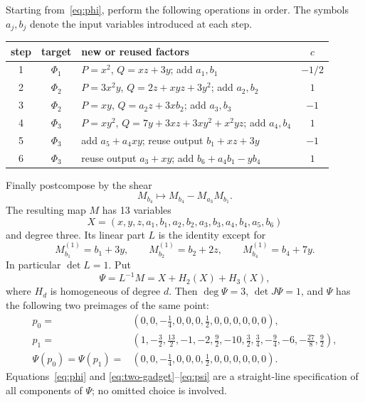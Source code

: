 \documentclass[11pt]{article}
\begin{document}
Starting from~\eqref{eq:phi}, perform the following operations in order.
The symbols $a_j,b_j$ denote the input variables introduced at each step.
\begin{center}
\small
\begin{tabularx}{\textwidth}{@{}c c X c@{}}
\toprule
step & target & new or reused factors & $c$\\
\midrule
1 & $\Phi_1$ & $P=x^2$, $Q=xz+3y$; add $a_1,b_1$ & $-1/2$\\
2 & $\Phi_2$ & $P=3x^2y$, $Q=2z+xyz+3y^2$; add $a_2,b_2$ & $1$\\
3 & $\Phi_2$ & $P=xy$, $Q=a_2z+3xb_2$; add $a_3,b_3$ & $-1$\\
4 & $\Phi_3$ & $P=xy^2$, $Q=7y+3xz+3xy^2+x^2yz$; add $a_4,b_4$ & $1$\\
5 & $\Phi_3$ & add $a_5+a_4xy$; reuse output $b_1+xz+3y$ & $-1$\\
6 & $\Phi_3$ & reuse output $a_3+xy$; add $b_6+a_4b_1-yb_4$ & $1$\\
\bottomrule
\end{tabularx}
\end{center}
Finally postcompose by the shear
\begin{equation}
  M_{b_4}\longmapsto M_{b_4}-M_{a_3}M_{b_1}.
  \label{eq:final-shear}
\end{equation}
The resulting map $M$ has 13 variables
\begin{equation}
 X=(x,y,z,a_1,b_1,a_2,b_2,a_3,b_3,a_4,b_4,a_5,b_6)
 \label{eq:variables}
\end{equation}
and degree three.  Its linear part $L$ is the identity except for
\begin{equation}
 M_{b_1}^{(1)}=b_1+3y,\qquad
 M_{b_2}^{(1)}=b_2+2z,\qquad
 M_{b_4}^{(1)}=b_4+7y.
\end{equation}
In particular $\det L=1$.  Put
\begin{equation}
  \Psi=L^{-1}M=X+H_2(X)+H_3(X),
  \label{eq:psi}
\end{equation}
where $H_d$ is homogeneous of degree $d$.  Then $\deg\Psi=3$,
$\det J\Psi=1$, and $\Psi$ has the following two preimages of the same point:
\begin{align}
p_0={}&(0,0,-\tfrac14,0,0,0,\tfrac12,0,0,0,0,0,0),\nonumber\\
p_1={}&(1,-\tfrac32,\tfrac{13}2,-1,-2,\tfrac92,-10,
\tfrac32,\tfrac34,-\tfrac94,-6,-\tfrac{27}8,\tfrac92),\label{eq:p-collision}\\
\Psi(p_0)=\Psi(p_1)={}&(0,0,-\tfrac14,0,0,0,\tfrac12,0,0,0,0,0,0).
\nonumber
\end{align}
Equations~\eqref{eq:phi} and \eqref{eq:two-gadget}--\eqref{eq:psi} are a
straight-line specification of all components of $\Psi$; no omitted choice is
involved.
\end{document}
